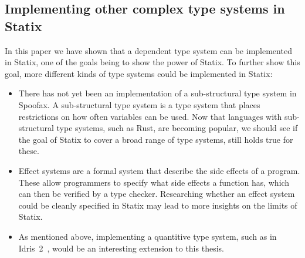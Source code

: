 \subsection*{Implementing other complex type systems in Statix}

In this paper we have shown that a dependent type system can be implemented in Statix, one of the goals being to show the power of Statix. To further show this goal, more different kinds of type systems could be implemented in Statix:

\begin{itemize}
	\item There has not yet been an implementation of a sub-structural type system in Spoofax. A sub-structural type system is a type system that places restrictions on how often variables can be used. Now that languages with sub-structural type systems, such as Rust, are becoming popular, we should see if the goal of Statix to cover a broad range of type systems, still holds true for these. 
	\item Effect systems are a formal system that describe the side effects of a program. These allow programmers to specify what side effects a function has, which can then be verified by a type checker. Researching whether an effect system could be cleanly specified in Statix may lead to more insights on the limits of Statix.
	\item As mentioned above, implementing a quantitive type system, such as in Idris~2~\cite{idris2}, would be an interesting extension to this thesis. 
\end{itemize}